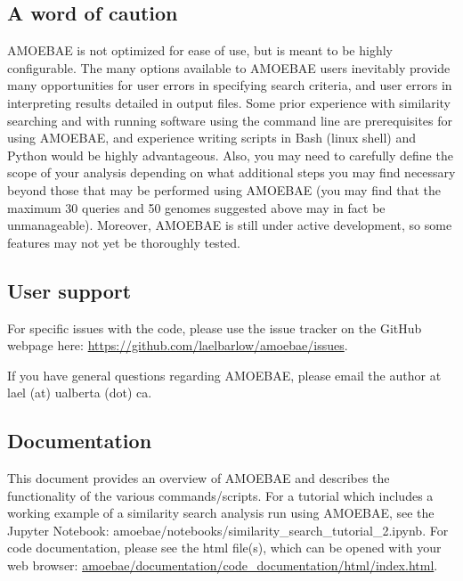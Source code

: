 \documentclass[12pt,letterpaper]{article}
\begin{document}
\begin{linenumbers}
\subsection{A word of caution}

AMOEBAE is not optimized for ease of use, but is meant to be highly
configurable. The many options available to AMOEBAE users inevitably provide
many opportunities for user errors in specifying search criteria, and user errors in
interpreting results detailed in output files. Some prior experience with
similarity searching and with running software using the command line are
prerequisites for using AMOEBAE, and experience writing scripts in Bash (linux
shell) and Python would be highly advantageous. Also, you may need to
carefully define the scope of your analysis depending on what additional steps
you may find necessary beyond those that may be performed using AMOEBAE (you
may find that the maximum 30 queries and 50 genomes suggested above may in
fact be unmanageable). Moreover, AMOEBAE is still under active development, so
some features may not yet be thoroughly tested.



\subsection{User support}

For specific issues with the code, please use the issue tracker on the GitHub
    webpage here: \url{https://github.com/laelbarlow/amoebae/issues}. 

If you have general questions regarding AMOEBAE, please email the author at
    lael (at) ualberta (dot) ca.

\subsection{Documentation}

This document provides an overview of AMOEBAE and describes the functionality
of the various commands/scripts. For a tutorial which includes a working
example of a similarity search analysis run using AMOEBAE, see the Jupyter
Notebook: amoebae/notebooks/similarity\_search\_tutorial\_2.ipynb. For code
documentation, please see the html file(s), which can be opened with your web
browser: \url{amoebae/documentation/code_documentation/html/index.html}.



\end{linenumbers}
\end{document}
